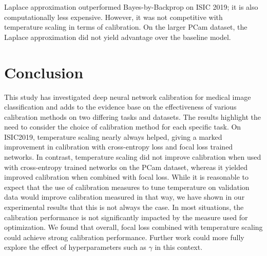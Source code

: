 Laplace approximation outperformed Bayes-by-Backprop on ISIC 2019; it is also computationally less expensive. However, it was not competitive with temperature scaling in terms of calibration. On the larger PCam dataset, the Laplace approximation did not yield advantage over the baseline model.



\section{Conclusion}
\label{sec:calibration_conclusion}
This study has investigated deep neural network calibration for medical image classification and adds to the evidence base on the effectiveness of various calibration methods on two differing tasks and datasets. The results highlight the need to consider the choice of calibration method for each specific task. On ISIC2019, temperature scaling nearly always helped, giving a marked improvement in calibration with cross-entropy loss and focal loss trained networks. In contrast, temperature scaling did not improve calibration when used with cross-entropy trained networks on the PCam dataset, whereas it yielded improved calibration when combined with focal loss. While it is reasonable to expect that the use of calibration measures to tune temperature on validation data would improve calibration measured in that way, we have shown in our experimental results that this is not always the case. In most situations, the calibration performance is not significantly impacted by the measure used for optimization. We found that overall, focal loss combined with temperature scaling could achieve strong calibration performance. Further work could more fully explore the effect of hyperparameters such as $\gamma$ in this context.